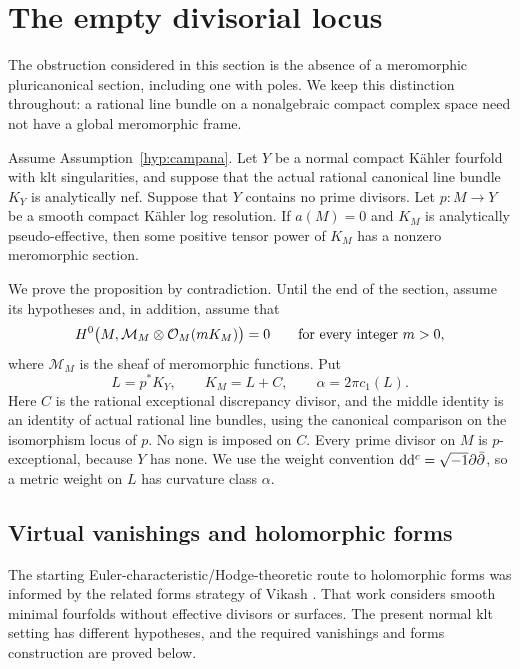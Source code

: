 \section{The empty divisorial locus}
\label{fol:section}

The obstruction considered in this section is the absence of a meromorphic
pluricanonical section, including one with poles.  We keep this distinction
throughout: a rational line bundle on a nonalgebraic compact complex space
need not have a global meromorphic frame.

\begin{proposition}\label{fol:empty-case}
Assume Assumption~\ref{hyp:campana}.  Let $Y$ be a normal compact K\"ahler
fourfold with klt singularities, and suppose that the actual rational
canonical line bundle $K_Y$ is analytically nef.  Suppose that $Y$ contains
no prime divisors.  Let $p\colon M\to Y$ be a smooth compact K\"ahler log
resolution.  If $a(M)=0$ and $K_M$ is analytically pseudo-effective, then
some positive tensor power of $K_M$ has a nonzero meromorphic section.
\end{proposition}

We prove the proposition by contradiction.  Until the end of the section,
assume its hypotheses and, in addition, assume that
\begin{equation}\label{fol:no-meromorphic}
 H^0\bigl(M,\mathcal M_M\otimes\mathcal{O}_M(mK_M)\bigr)=0
 \qquad\text{for every integer }m>0,
\end{equation}
where $\mathcal M_M$ is the sheaf of meromorphic functions.  Put
\begin{equation}\label{fol:canonical-comparison}
 L=p^*K_Y,\qquad K_M=L+C,\qquad \alpha=2\pi c_1(L).
\end{equation}
Here $C$ is the rational exceptional discrepancy divisor, and the middle
identity is an identity of actual rational line bundles, using the
canonical comparison on the isomorphism locus of $p$.  No sign is imposed
on $C$.  Every prime divisor on $M$ is $p$-exceptional, because $Y$ has
none.  We use the weight convention $\mathrm{d}\mathrm{d}^{c}=\sqrt{-1}\partial\bar\partial$, so a
metric weight on $L$ has curvature class $\alpha$.

\subsection{Virtual vanishings and holomorphic forms}

The starting Euler-characteristic/Hodge-theoretic route to holomorphic
forms was informed by the related forms strategy of Vikash \cite{Vikash2026}.
That work considers smooth minimal fourfolds without effective divisors
or surfaces.  The present normal klt setting has different hypotheses,
and the required vanishings and forms construction are proved below.

